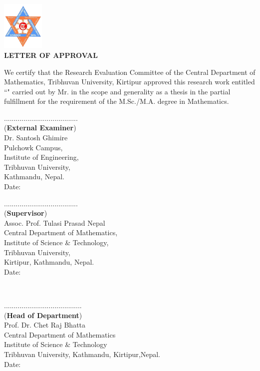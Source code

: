 
 \begin{center}
 	\includegraphics[width=0.15\textwidth]{pictures/tulogo.png}\\[1.5cm]
 {\Large{\bfseries{LETTER OF APPROVAL}}}\\[.5cm]
\end{center}

\noindent
We certify that the Research Evaluation Committee of the Central Department of Mathematics, Tribhuvan University, Kirtipur approved this research work entitled ``\textbf{\thetitle}" carried out by Mr. \textbf{\theauthor} in the scope and generality as a thesis in the partial fulfillment for the requirement of the M.Sc./M.A. degree in Mathematics.
\\[3.5cm]
\begin{minipage}{0.45\textwidth}
                ......................................\\[2mm]
                (\textbf{External Examiner})\\
                Dr. Santosh Ghimire\\
                Pulchowk Campus,\\
                Institute of Engineering,\\
                Tribhuvan University,\\
                Kathmandu, Nepal.\\
		Date: \thedate
\end{minipage} \hspace{3mm}
%
\begin{minipage}{0.55\textwidth}
                ......................................\\
                (\textbf{Supervisor}) \\
		Assoc. Prof. Tulasi Prasad Nepal \\
		Central Department of Mathematics,\\
                Institute of Science \& Technology,\\
                Tribhuvan University,\\
                Kirtipur, Kathmandu, Nepal.\\[0.1cm]
		Date: \thedate

\end{minipage}\\[3cm]

\begin{center}
  ........................................\\
  	(\textbf{Head of Department})\\
        Prof. Dr. Chet Raj Bhatta\\
        Central Department of Mathematics\\
	 Institute of Science \& Technology\\
	 Tribhuvan University, Kathmandu,
	 Kirtipur,Nepal.\\
	Date: \thedate
\end{center}
